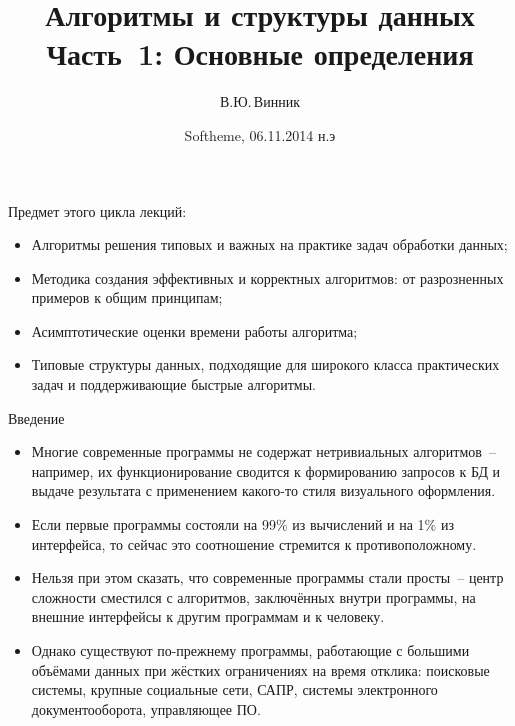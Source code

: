 \documentclass[landscape]{slides}
\begin{document}
\author{В.Ю.\,Винник}

\title{Алгоритмы и структуры данных\\
Часть~1: Основные определения}

\date{Softheme, 06.11.2014 н.э}

\maketitle

\begin{slide}
  Предмет этого цикла лекций:
  \begin{itemize}
      \item Алгоритмы решения типовых и важных на практике задач обработки данных;
      \item Методика создания эффективных и корректных алгоритмов: от разрозненных примеров к общим принципам;
      \item Асимптотические оценки времени работы алгоритма;
      \item Типовые структуры данных, подходящие для широкого класса практических задач и поддерживающие быстрые алгоритмы.
    \end{itemize}
\end{slide}

\begin{slide}
  Введение
  \begin{itemize}
    \item Многие современные программы не содержат нетривиальных алгоритмов~-- например, их функционирование сводится
      к формированию запросов к БД и выдаче результата с применением какого-то стиля визуального оформления.
    \item Если первые программы состояли на 99\% из вычислений и на 1\% из интерфейса, то сейчас это соотношение
      стремится к противоположному.
    \item Нельзя при этом сказать, что современные программы стали просты~-- центр сложности сместился с
      алгоритмов, заключённых внутри программы, на внешние интерфейсы к другим программам и к человеку.
    \item Однако существуют по-прежнему программы, работающие с большими объёмами данных при жёстких ограничениях на
      время отклика: поисковые системы, крупные социальные сети, САПР, системы электронного документооборота, управляющее ПО.
  \end{itemize}
\end{slide}
\end{document}
